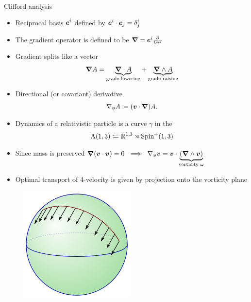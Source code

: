 \documentclass[aspectratio=169]{beamer}
\begin{document}
\begin{frame}{Clifford analysis}
\vfill
\begin{itemize}
	\item Reciprocal basis $\boldsymbol{e}^i$ defined by $\boldsymbol{e}^i \cdot \boldsymbol{e}_j = \delta^i_j$
	\item The gradient operator is defined to be $\boldsymbol{\nabla} = \boldsymbol{e}^i \frac{\partial}{\partial x^i}$
	\item Gradient splits like a vector
	\[
	\boldsymbol{\nabla} A = \underbrace{\boldsymbol{\nabla} \cdot A}_{\textrm{grade lowering}} + \underbrace{\boldsymbol{\nabla} \wedge A}_{\textrm{grade raising}}
	\]
	\item Directional (or covariant) derivative
	\[
	\nabla_{\boldsymbol{v}} A \coloneqq (\boldsymbol{v}\cdot \boldsymbol{\nabla})A.
	\]
\end{itemize}
\vfill
\end{frame}

\begin{frame}{}
\vfill
\begin{itemize}
	\item Dynamics of a relativistic particle is a curve $\gamma$ in the 
\[
\mathrm{A}(1,3) \coloneqq \mathbb{R}^{1,3}\rtimes \mathrm{Spin}^+(1,3)
\]

        \item Since mass is preserved $\boldsymbol{\nabla} ({\boldsymbol{v}} \cdot {\boldsymbol{v}}) = 0 ~\implies~ \nabla_{\boldsymbol{v}} {\boldsymbol{v}} =  {\boldsymbol{v}}\cdot \underbrace{(\boldsymbol{\nabla} \wedge {\boldsymbol{v}})}_{\textrm{vorticity }\omega}$
        \item Optimal transport of 4-velocity is given by projection onto the vorticity plane
        \end{itemize}
                \begin{figure}
                    \centering
                    \includegraphics[width=.2\textwidth]{figures/parallel_transport.png}
                \end{figure}
\vfill
\end{frame}
\end{document}
